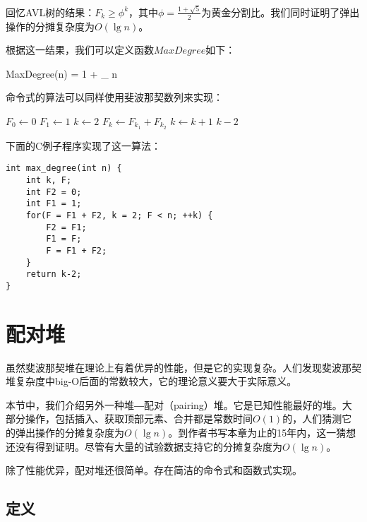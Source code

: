 \documentclass{ctexart}
\begin{document}
回忆AVL树的结果：$F_k \geq \phi^k$，其中$\phi = \frac{1+\sqrt{5}}{2}$为黄金分割比。我们同时证明了弹出操作的分摊复杂度为$O(\lg n)$。

根据这一结果，我们可以定义函数$MaxDegree$如下：

\be
  MaxDegree(n) = 1 + \lfloor \log_{\phi} n \rfloor
\ee

命令式的算法可以同样使用斐波那契数列来实现：

\begin{algorithmic}[1]
  \State $F_0 \gets 0$
  \State $F_1 \gets 1$
  \State $k \gets 2$
  \Repeat
    \State $F_k \gets F_{k_1} + F_{k_2}$
    \State $k \gets k+1$
  \State \Return $k-2$
\EndFunction
\end{algorithmic}

下面的C例子程序实现了这一算法：

\lstset{language=C}
\begin{lstlisting}
int max_degree(int n) {
    int k, F;
    int F2 = 0;
    int F1 = 1;
    for(F = F1 + F2, k = 2; F < n; ++k) {
        F2 = F1;
        F1 = F;
        F = F1 + F2;
    }
    return k-2;
}
\end{lstlisting}


\section{配对堆}
\label{pairing-heap} 

虽然斐波那契堆在理论上有着优异的性能，但是它的实现复杂。人们发现斐波那契堆复杂度中big-O后面的常数较大，它的理论意义要大于实际意义。

本节中，我们介绍另外一种堆―配对（pairing）堆。它是已知性能最好的堆。大部分操作，包括插入、获取顶部元素、合并都是常数时间$O(1)$的，人们猜测它的弹出操作的分摊复杂度为$O(\lg n)$\cite{pairing-heap}\cite{okasaki-book}。到作者书写本章为止的15年内，这一猜想还没有得到证明。尽管有大量的试验数据支持它的分摊复杂度为$O(\lg n)$。

除了性能优异，配对堆还很简单。存在简洁的命令式和函数式实现。

\subsection{定义}
\end{document}
